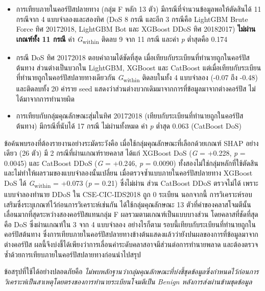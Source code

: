 \begin{itemize}
    \item การเทียบภายในคอร์ปัสปลายทาง (กลุ่ม F หลัก 13 ตัว) มีกรณีที่จำนวนข้อมูลพอให้ตัดสินได้ 11 กรณีจาก 4 แบบจำลองและสองทิศ (DoS 8 กรณี และอีก 3 กรณีคือ LightGBM Brute Force ทิศ 2017\dirarrow{}2018, LightGBM Bot และ XGBoost DDoS ทิศ 2018\dirarrow{}2017) \textbf{ไม่ผ่านเกณฑ์ทั้ง 11 กรณี} ค่า \textit{G}\textsubscript{within} ติดลบ 9 จาก 11 กรณี และค่า \textit{p} ต่ำสุดคือ 0.174
    \item กรณี DoS ทิศ 2017\dirarrow{}2018 ตอบคำถามได้ชัดที่สุด เมื่อเทียบกับระเบียนที่ทำนายถูกในคอร์ปัสต้นทาง ส่วนต่างเป็นบวกใน LightGBM, XGBoost และ CatBoost แต่เมื่อเทียบกับระเบียนที่ทำนายถูกในคอร์ปัสปลายทางเดียวกัน \textit{G}\textsubscript{within} ติดลบในทั้ง 4 แบบจำลอง (-0.07 ถึง -0.48) และติดลบทั้ง 20 ค่าราย seed แสดงว่าส่วนต่างบวกเดิมมาจากการที่ข้อมูลมาจากต่างคอร์ปัส ไม่ได้มาจากการทำนายผิด
    \item การเทียบกับกลุ่มคุณลักษณะสุ่มในทิศ 2017\dirarrow{}2018 (เทียบกับระเบียนที่ทำนายถูกในคอร์ปัสต้นทาง) มีกรณีที่นับได้ 17 กรณี ไม่ผ่านทั้งหมด ค่า \textit{p} ต่ำสุด 0.063 (CatBoost DoS)
\end{itemize}

ข้อค้นพบรองที่ต้องรายงานอย่างระมัดระวังคือ เมื่อใช้กลุ่มคุณลักษณะที่เลือกด้วยเกณฑ์ SHAP อย่างเดียว (26 ตัว) มี 2 กรณีที่ผ่านเกณฑ์รายคลาส ได้แก่ XGBoost DoS (\textit{G} = +0.228, \textit{p} = 0.0045) และ CatBoost DDoS (\textit{G} = +0.246, \textit{p} = 0.0090) ทั้งสองไม่ใช่กลุ่มหลักที่ใช้ตัดสิน และไม่ทำให้ผลรวมของแบบจำลองนั้นเปลี่ยน เมื่อตรวจซ้ำแบบภายในคอร์ปัสปลายทาง XGBoost DoS ได้ \textit{G}\textsubscript{within} = +0.073 (\textit{p} = 0.21) ซึ่งไม่ผ่าน ส่วน CatBoost DDoS ตรวจไม่ได้ เพราะแบบจำลองทำนาย DDoS ใน CSE-CIC-IDS2018 ถูก 0 ระเบียน นอกจากนี้ การวิเคราะห์รอบเสริมซึ่งระบุเกณฑ์ไว้ก่อนการวิเคราะห์เช่นกัน ได้ใช้กลุ่มคุณลักษณะ 13 ตัวที่ค่าของคลาสโจมตีนั้นเลื่อนมากที่สุดระหว่างสองคอร์ปัสแทนกลุ่ม F ผลรวมตามเกณฑ์เป็นแบบบางส่วน โดยคลาสที่ชัดที่สุดคือ DoS ซึ่งผ่านเกณฑ์ใน 3 จาก 4 แบบจำลอง อย่างไรก็ตาม รอบนี้เทียบกับระเบียนที่ทำนายถูกในคอร์ปัสต้นทาง ซึ่งการเทียบภายในคอร์ปัสปลายทางข้างต้นแสดงแล้วว่ายังปนผลของการที่ข้อมูลมาจากต่างคอร์ปัส ผลนี้จึงบ่งชี้ได้เพียงว่าการเลื่อนค่าระดับคลาสอาจมีส่วนต่อการทำนายพลาด และต้องตรวจซ้ำด้วยการเทียบภายในคอร์ปัสปลายทางก่อนนำไปสรุป

ข้อสรุปที่ใช้ได้อย่างปลอดภัยคือ \emph{ไม่พบหลักฐานว่ากลุ่มคุณลักษณะที่บ่งชี้ชุดข้อมูลซึ่งกำหนดไว้ก่อนการวิเคราะห์เป็นสาเหตุโดยตรงของการทำนายระเบียนโจมตีเป็น Benign หลังการส่งผ่านข้ามชุดข้อมูล}

\clearpage
